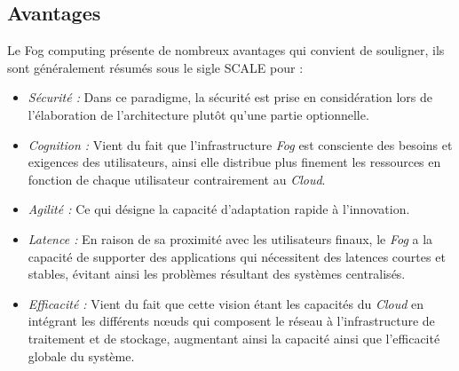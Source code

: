 \subsection{Avantages}
Le Fog computing présente de nombreux avantages qui convient de souligner, ils sont généralement résumés sous le sigle SCALE pour :
\begin{itemize}
  \item \emph{Sécurité :} Dans ce paradigme, la sécurité est prise en considération lors de l'élaboration de l'architecture plutôt qu'une partie optionnelle.
  \item \emph{Cognition :} Vient du fait que l'infrastructure \emph{Fog} est consciente des besoins et exigences des utilisateurs, ainsi elle distribue plus finement les ressources en fonction de chaque utilisateur contrairement au \emph{Cloud}.
  \item \emph{Agilité :} Ce qui désigne la capacité d'adaptation rapide à l'innovation.
  \item \emph{Latence :} En raison de sa proximité avec les utilisateurs finaux, le \emph{Fog} a la capacité de supporter des applications qui nécessitent des latences courtes et stables, évitant ainsi les problèmes résultant des systèmes centralisés.
  \item \emph{Efficacité :} Vient du fait que cette vision étant les capacités du \emph{Cloud} en intégrant
  les différents nœuds qui composent le réseau à l'infrastructure de traitement et de stockage, augmentant ainsi la capacité ainsi que l'efficacité globale du système.
\end{itemize}

